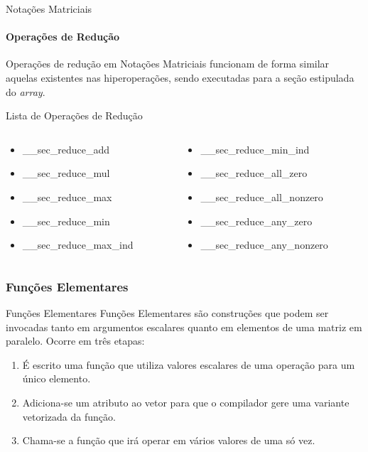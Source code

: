 \documentclass{beamer}
\begin{document}
\begin{frame}[fragile]{Notações Matriciais}
\framesubtitle{Operações de Redução}
	Operações de redução em Notações Matriciais funcionam de forma similar
	aquelas existentes nas hiperoperações, sendo executadas para a seção
	estipulada do \textit{array}.
\begin{block}{Lista de Operações de Redução}
\begin{small}
\begin{small}
\begin{columns}
\begin{column}{0.45\textwidth}
\begin{itemize}
    \item \_\_sec\_reduce\_add
    \item \_\_sec\_reduce\_mul
    \item \_\_sec\_reduce\_max
    \item \_\_sec\_reduce\_min
    \item \_\_sec\_reduce\_max\_ind
\end{itemize}
\end{column}
\begin{column}{0.45\textwidth}
\begin{itemize}
    \item \_\_sec\_reduce\_min\_ind
    \item \_\_sec\_reduce\_all\_zero
    \item \_\_sec\_reduce\_all\_nonzero
    \item \_\_sec\_reduce\_any\_zero
    \item \_\_sec\_reduce\_any\_nonzero
\end{itemize}
\end{column}
\end{columns}
\end{small}
\end{small}
\end{block}
\end{frame}

\subsubsection{Funções Elementares}
\begin{frame}{Funções Elementares}
    Funções Elementares são construções que podem ser invocadas tanto em argumentos escalares quanto em elementos de uma matriz em paralelo.
    Ocorre em três etapas:
\begin{enumerate}
    \item É escrito uma função que utiliza valores escalares de uma operação para um único elemento.
\pause
    \item Adiciona-se um atributo ao vetor para que o compilador gere uma variante vetorizada da função.
\pause
    \item Chama-se a função que irá operar em vários valores de uma só vez.
\end{enumerate}

\end{frame}
\end{document}
